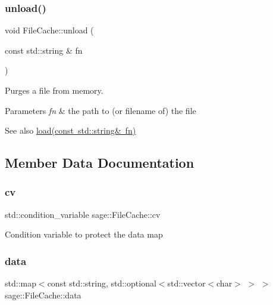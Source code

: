 \subsubsection{\texorpdfstring{unload()}{unload()}}
{\footnotesize\ttfamily void File\+Cache\+::unload (\begin{DoxyParamCaption}\item[{const std\+::string \&}]{fn }\end{DoxyParamCaption})}



Purges a file from memory. 


\begin{DoxyParams}{Parameters}
{\em fn} & the path to (or filename of) the file \\
\hline
\end{DoxyParams}
\begin{DoxySeeAlso}{See also}
\mbox{\hyperlink{classsage_1_1FileCache_addb15593e848f038a5d7a7c6c3828053}{load(const std\+::string\& fn)}} 
\end{DoxySeeAlso}


\subsection{Member Data Documentation}
\mbox{\label{classsage_1_1FileCache_ac6f227036472f8b5b5265d3126f992ae}} 
\subsubsection{\texorpdfstring{cv}{cv}}
{\footnotesize\ttfamily std\+::condition\+\_\+variable sage\+::\+File\+Cache\+::cv\hspace{0.3cm}{\ttfamily [private]}}

Condition variable to protect the data map \mbox{\label{classsage_1_1FileCache_ac3d22a89c9d2ab8aa2af4949002a8df4}} 
\subsubsection{\texorpdfstring{data}{data}}
{\footnotesize\ttfamily std\+::map$<$const std\+::string, std\+::optional$<$std\+::vector$<$char$>$ $>$ $>$ sage\+::\+File\+Cache\+::data\hspace{0.3cm}{\ttfamily [private]}}

